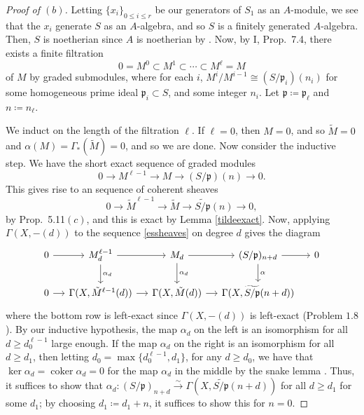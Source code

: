 \documentclass[12pt,letterpaper]{article}
\theoremstyle{definition}
\theoremstyle{remark}
\numberwithin{equation}{section}
\numberwithin{figure}{problem}
\DeclareMathOperator{\Coker}{coker}
\newcommand{\isoto}{\overset{\sim}{\to}}
\begin{document}
\begin{proof}[Proof of $(b)$]
  Letting $\{x_i\}_{0 \le i \le r}$ be our generators of $S_1$ as an $A$-module, we see that the $x_i$ generate $S$ as an $A$-algebra, and so $S$ is a finitely generated $A$-algebra. Then, $S$ is noetherian since $A$ is noetherian by \cite[Cor.~7.7]{AM69}. Now, by I, Prop.~7.4, there exists a finite filtration
  \begin{equation*}
    0 = M^0 \subset M^1 \subset \cdots \subset M^\ell = M
  \end{equation*}
  of $M$ by graded submodules, where for each $i$, $M^i/M^{i-1} \cong (S/\mathfrak{p}_i)(n_i)$ for some homogeneous prime ideal $\mathfrak{p}_i \subset S$, and some integer $n_i$. Let $\mathfrak{p} \coloneqq \mathfrak{p}_\ell$ and $n \coloneqq n_\ell$.
  \par We induct on the length of the filtration $\ell$. If $\ell = 0$, then $M = 0$, and so $\tilde{M} = 0$ and $\alpha(M) = \Gamma_*(\tilde{M}) = 0$, and so we are done. Now consider the inductive step. We have the short exact sequence of graded modules
  \begin{equation*}
    0 \longrightarrow M^{\ell-1} \longrightarrow M \longrightarrow (S/\mathfrak{p})(n) \longrightarrow 0.
  \end{equation*}
  This gives rise to an sequence of coherent sheaves
  \begin{equation}\label{essheaves}
    0 \longrightarrow \tilde{M}^{\ell-1} \longrightarrow \tilde{M} \longrightarrow \widetilde{S/\mathfrak{p}}(n) \longrightarrow 0,
  \end{equation}
  by Prop.~5.11$(c)$, and this is exact by Lemma \ref{tildeexact}. Now, applying $\Gamma(X,-(d))$ to the sequence \eqref{essheaves} on degree $d$ gives the diagram
  \begin{equation*}
    \begin{tikzcd}[column sep=small]
      0 \rar & M^{\ell-1}_d \rar\dar{\alpha_d} & M_d \rar\dar{\alpha_d} & (S/\mathfrak{p})_{n+d} \rar\dar{\alpha} & 0\\
      0 \rar & \Gamma(X,\tilde{M}^{\ell-1}(d)) \rar & \Gamma(X,\tilde{M}(d)) \rar & \Gamma(X,\widetilde{S/\mathfrak{p}}(n+d))
    \end{tikzcd}
  \end{equation*}
  where the bottom row is left-exact since $\Gamma(X,-(d))$ is left-exact (Problem $1.8$). By our inductive hypothesis, the map $\alpha_d$ on the left is an isomorphism for all $d \ge d_{0}^{\ell-1}$ large enough. If the map $\alpha_d$ on the right is an isomorphism for all $d \ge d_1$, then letting $d_0 = \max\{d_0^{\ell-1},d_1\}$, for any $d \ge d_0$, we have that $\ker \alpha_d = \Coker \alpha_d = 0$ for the map $\alpha_d$ in the middle by the snake lemma \cite[Prop.~2.10]{AM69}. Thus, it suffices to show that $\alpha_d\colon(S/\mathfrak{p})_{n+d} \isoto \Gamma(X,\widetilde{S/\mathfrak{p}}(n+d))$ for all $d \ge d_1$ for some $d_1$; by choosing $d_1 \coloneqq d_1 + n$, it suffices to show this for $n=0$.

\end{proof}
\end{document}
